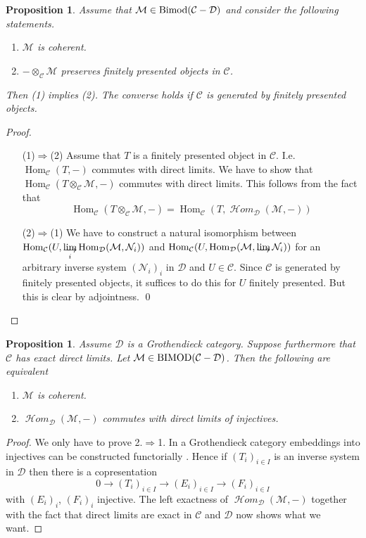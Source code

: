 \documentclass{amsproc}
\def\Cscr{{\mathcal C}}
\def\Dscr{{\mathcal D}}
\def\Hscr{{\mathcal H}}
\def\Mscr{{\mathcal M}}
\def\Nscr{{\mathcal N}}
\def\HHom{\operatorname {\Hscr \mathit{om}}}
\def\Bimod{\mathop{\text{Bimod}}}
\def\BIMOD{\mathop{\text{BIMOD}}}
\def\Hom{\operatorname {Hom}}
\def\HHom{\operatorname {\Hscr \mathit{om}}}
\def\r{\rightarrow}
\let\oldtext\text
\def\text#1{\oldtext{\upshape #1}}
\newtheorem{propositions}[lemmas]{Proposition}
\theoremstyle{definition}
\theoremstyle{remark}
\def\dirlim{\mathop{\vtop{\baselineskip -100pt\lineskip -1pt\lineskiplimit 0pt
\setbox0\hbox{\upshape lim}\copy0\hbox to \wd0{\rightarrowfill}}}\limits}
\numberwithin{equation}{section}
\numberwithin{table}{section}
\numberwithin{figure}{section}
\begin{document}
\begin{propositions}
\label{ref:3.1.6a}
Assume that $\Mscr\in\Bimod(\Cscr-\Dscr)$ and consider the following
statements.
\begin{enumerate}
\item $\Mscr$ is coherent.
\item $-\otimes_{\Cscr}\Mscr$ preserves finitely presented objects in
$\Cscr$.
\end{enumerate}
Then (1) implies (2). The converse holds if $\Cscr$ is generated by
finitely presented objects.
\end{propositions}
\begin{proof}\strut
\begin{itemize}
\item[(1)$\Rightarrow$(2)]
Assume that $T$ is a finitely presented object in $\Cscr$. I.e.
$\Hom_\Cscr(T,-)$ commutes with  direct limits. We have to show that
$\Hom_\Cscr(T\otimes_\Cscr \Mscr,-)$ commutes with  direct
limits. This follows 
from the fact that 
\[
\Hom_\Cscr(T\otimes_\Cscr\Mscr,-)=\Hom_\Cscr(T,\HHom_\Dscr(\Mscr,-))
\]
\item[(2)$\Rightarrow$(1)] We have to construct a natural isomorphism
between
$\Hom_\Cscr(U,\dirlim_i \Hom_\Dscr(\Mscr,\Nscr_i))$ and
$\Hom_{\Cscr}(U,\Hom_\Dscr(\Mscr,\dirlim \Nscr_i))$ for an arbitrary
inverse system $(\Nscr_i)_i$ in $\Dscr$ and $U\in\Cscr$. Since
$\Cscr$ is generated by finitely presented objects, it suffices to do
this for $U$ finitely presented. But this is clear by adjointness.
\qed\end{itemize}
\def\qed{}\end{proof}
\begin{propositions} 
\label{ref:3.1.7a}
Assume $\Dscr$ is a Grothendieck category. Suppose
  furthermore that $\Cscr$ has exact direct limits.
 Let $\Mscr\in \BIMOD(\Cscr-\Dscr)$. Then the following are
  equivalent
\begin{enumerate} \item $\Mscr$ is coherent.
\item $\HHom_\Dscr(\Mscr,-)$  commutes with direct limits of injectives.
\end{enumerate}
\end{propositions}
\begin{proof} 
We only have to prove 2.$\Rightarrow$1. In a Grothendieck category
embeddings into injectives can be constructed functorially
\cite{Gr}. Hence if $(T_i)_{i\in I}$ is an inverse system in
$\Dscr$ 
then there is a copresentation
\[
0\r  (T_i)_{i\in I}\r  (E_i)_{i\in I}\r  (F_i)_{i\in I}
\]
with $(E_i)_i$, $(F_i)_i$ injective. The left exactness of
$\HHom_\Dscr(\Mscr,-)$ together with the fact that direct limits are
exact in $\Cscr$ and $\Dscr$ now shows what we want.
\end{proof}
\end{document}
